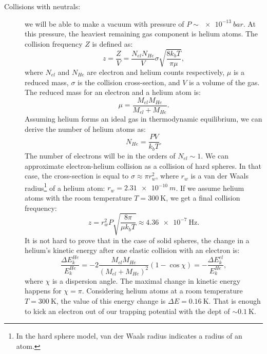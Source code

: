 \begin{description}
	\item[Collisions with neutrals:] we will be able to make a vacuum with pressure of $P\sim \SI{e-13}{bar}$. At this pressure, the heaviest remaining gas component is helium atoms. The collision frequency $Z$ is defined as:
\begin{equation}
	\label{collision frequency}
	z = \frac{Z}{V} = \frac{N_{el} N_{He}}{V} \sigma \sqrt{\frac{8 k_b T}{\pi \mu}},
\end{equation}
where $N_{el}$ and $N_{He}$ are electron and helium counts respectively, $\mu$ is a reduced mass, $\sigma$ is the collision cross-section, and $V$ is a volume of the gas. The reduced mass for an electron and a helium atom is:
\begin{equation}
	\label{reduced mass}
	\mu = \frac{M_{el} M_{He}}{M_{el} + M_{He}}.
\end{equation}
Assuming helium forms an ideal gas in thermodynamic equilibrium, we can derive the number of helium atoms as:
\begin{equation}
	\label{number of helium atoms}
	N_{He} = \frac{P V}{k_b T}.
\end{equation}
The number of electrons will be in the orders of $N_{el} \sim 1$. We can approximate electron-helium collision as a collision of hard spheres. In that case, the cross-section is equal to $\sigma \approx \pi r_w^2$, where $r_w$ is a van der Waals radius\footnote{In the hard sphere model, van der Waals radius indicates a radius of an atom.} of a helium atom: $r_w = \SI{2.31e-10}{m}$. If we assume helium atoms with the room temperature $T=\SI{300}{\kelvin}$, we get a final collision frequency:
\begin{equation}
	\label{collision frequency value}
	z = r_w^2 P \sqrt{\frac{8\pi}{\mu k_b T}} \approx \SI{4.36e-7}{\hertz}.
\end{equation}
It is not hard to prove that in the case of solid spheres, the change in a helium's kinetic energy after one elastic collision with an electron is:
\begin{equation}
	\label{change in energy after collision}
	\frac{\Delta E_k^{He}}{E_k^{He}} = \minus 2\frac{M_{el} M_{He}}{(M_{el} + M_{He})^2} \left(1 \minus \cos \chi \right) = \minus\frac{\Delta E_k^{el}}{E_k^{He}},
\end{equation}
where $\chi$ is a dispersion angle. The maximal change in kinetic energy happens for $\chi = \pi$. Considering helium atoms at a room temperature $T = \SI{300}{\kelvin}$, the value of this energy change is $\Delta E = \SI{0.16}{\kelvin}$. That is enough to kick an electron out of our trapping potential with the dept of $\sim\SI{0.1}{\kelvin}$.
\end{description}	

